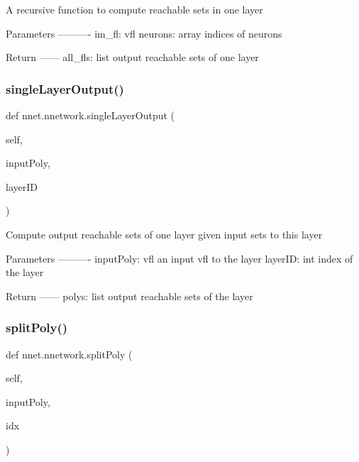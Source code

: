 \begin{DoxyVerb}A recursive function to compute reachable sets in one layer

Parameters
----------
im_fl: vfl
neurons: array
    indices of neurons

Return
------
all_fls: list
    output reachable sets of one layer
\end{DoxyVerb}
 \mbox{\label{classnnet_1_1nnetwork_a27f13ef2943f1c10aa7dd049726949fb}} 
\subsubsection{\texorpdfstring{single\+Layer\+Output()}{singleLayerOutput()}}
{\footnotesize\ttfamily def nnet.\+nnetwork.\+single\+Layer\+Output (\begin{DoxyParamCaption}\item[{}]{self,  }\item[{}]{input\+Poly,  }\item[{}]{layer\+ID }\end{DoxyParamCaption})}

\begin{DoxyVerb}Compute output reachable sets of one layer given input sets to this layer

Parameters
----------
inputPoly: vfl
    an input vfl to the layer
layerID: int
    index of the layer

Return
------
polys: list
    output reachable sets of the layer
\end{DoxyVerb}
 \mbox{\label{classnnet_1_1nnetwork_a0ffc5a42839ee2eb600c8f8113d3a20a}} 
\subsubsection{\texorpdfstring{split\+Poly()}{splitPoly()}}
{\footnotesize\ttfamily def nnet.\+nnetwork.\+split\+Poly (\begin{DoxyParamCaption}\item[{}]{self,  }\item[{}]{input\+Poly,  }\item[{}]{idx }\end{DoxyParamCaption})}

